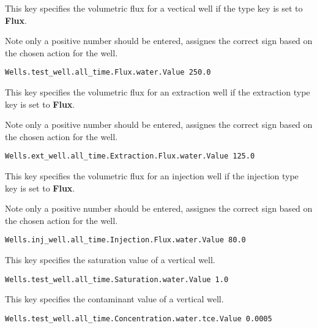 {
This key specifies the volumetric flux for a vectical well if the type
key is set to {\bf Flux}.

Note only a positive number should be entered, \parflow{} assignes the
correct sign based on the chosen action for the well.
}
\begin{display}\begin{verbatim}
Wells.test_well.all_time.Flux.water.Value 250.0
\end{verbatim}\end{display}

{
This key specifies the volumetric flux for an extraction well if the
extraction type key is set to {\bf Flux}.

Note only a positive number should be entered, \parflow{} assignes the
correct sign based on the chosen action for the well.
}
\begin{display}\begin{verbatim}
Wells.ext_well.all_time.Extraction.Flux.water.Value 125.0
\end{verbatim}\end{display}

{
This key specifies the volumetric flux for an injection well if the
injection type key is set to {\bf Flux}.

Note only a positive number should be entered, \parflow{} assignes the
correct sign based on the chosen action for the well.
}
\begin{display}\begin{verbatim}
Wells.inj_well.all_time.Injection.Flux.water.Value 80.0
\end{verbatim}\end{display}

{
This key specifies the saturation value of a vertical well.
}
\begin{display}\begin{verbatim}
Wells.test_well.all_time.Saturation.water.Value 1.0
\end{verbatim}\end{display}

{
This key specifies the contaminant value of a vertical well.
}
\begin{display}\begin{verbatim}
Wells.test_well.all_time.Concentration.water.tce.Value 0.0005
\end{verbatim}\end{display}

